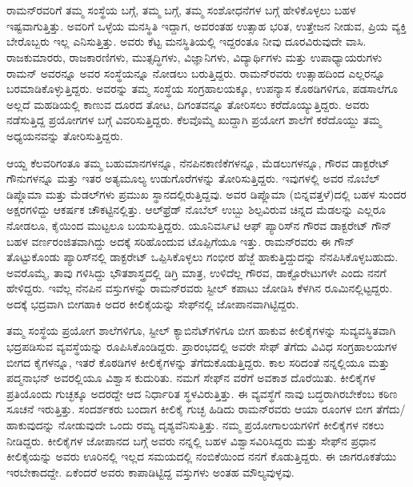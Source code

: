 
\chapter{}


ರಾಮನ್‍ರವರಿಗೆ ತಮ್ಮ ಸಂಸ್ಥೆಯ ಬಗ್ಗೆ, ತಮ್ಮ ಬಗ್ಗೆ, ತಮ್ಮ ಸಂಶೋಧನೆಗಳ ಬಗ್ಗೆ ಹೇಳಿಕೊಳ್ಳಲು ಬಹಳ ಇಷ್ಟವಾಗುತ್ತಿತ್ತು. ಅವರಿಗೆ ಒಳ್ಳೆಯ ಮನಸ್ಥಿತಿ ಇದ್ದಾಗ, ಅವರಂತಹ ಉತ್ಸಾಹ ಭರಿತ, ಉತ್ತೇಜನ ನೀಡುವ, ಪ್ರಿಯ ವ್ಯಕ್ತಿ ಬೇರೊಬ್ಬರು ಇಲ್ಲ ಎನಿಸುತ್ತಿತ್ತು. ಅವರು ಕೆಟ್ಟ ಮನಸ್ಥಿತಿಯಲ್ಲಿ ಇದ್ದರಂತೂ ನೀವು ದೂರವಿರುವುದೇ ವಾಸಿ. ರಾಜಕುಮಾರರು, ರಾಜಕಾರಣಿಗಳು, ಮುತ್ಸದ್ಧಿಗಳು, ವಿಜ್ಞಾನಿಗಳು, ವಿದ್ಯಾರ್ಥಿಗಳು ಮತ್ತು ಉಪಾಧ್ಯಾಯರುಗಳು ರಾಮನ್ ಅವರನ್ನೂ ಅವರ ಸಂಸ್ಥೆಯನ್ನೂ ನೋಡಲು ಬರುತ್ತಿದ್ದರು. ರಾಮನ್‍ರವರು ಉತ್ಸಾಹದಿಂದ ಎಲ್ಲರನ್ನೂ ಬರಮಾಡಿಕೊಳ್ಳುತ್ತಿದ್ದರು. ಅವರನ್ನು ತಮ್ಮ ಸಂಸ್ಥೆಯ ಸಂಗ್ರಹಾಲಯಕ್ಕೂ, ಉಪನ್ಯಾಸ ಕೊಠಡಿಗಳಿಗೂ, ಪಡಸಾಲೆಗೂ ಅಲ್ಲದೆ ಮಹಡಿಯಲ್ಲಿ ಕಾಣುವ ದೂರದ ತೋಟ, ದಿಗಂತವನ್ನೂ ತೋರಿಸಲು ಕರೆದೊಯ್ಯುತ್ತಿದ್ದರು. ಅವರು ನಡೆಸುತ್ತಿದ್ದ ಪ್ರಯೋಗಗಳ ಬಗ್ಗೆ ವಿವರಿಸುತ್ತಿದ್ದರು. ಕೆಲವೊಮ್ಮೆ ಖುದ್ದಾಗಿ ಪ್ರಯೋಗ ಶಾಲೆಗೆ ಕರೆದೊಯ್ದು ತಮ್ಮ ಅಧ್ಯಯನವನ್ನು ತೋರಿಸುತ್ತಿದ್ದರು.

ಆಯ್ದ ಕೆಲವರಿಗಂತೂ ತಮ್ಮ ಬಹುಮಾನಗಳನ್ನೂ, ನೆನಪಿನಕಾಣಿಕೆಗಳನ್ನೂ, ಮೆಡಲುಗಳನ್ನೂ, ಗೌರವ ಡಾಕ್ಟರೇಟ್ ಗೌನುಗಳನ್ನೂ ಮತ್ತು ಇತರ ಅತ್ಯಮೂಲ್ಯ ಉಡುಗೊರೆಗಳನ್ನು ತೋರಿಸುತ್ತಿದ್ದರು. ಇವುಗಳಲ್ಲಿ ಅವರ ನೊಬೆಲ್ ಡಿಪ್ಲೊಮಾ ಮತ್ತು ಮೆಡಲ್‍ಗಳು ಪ್ರಮುಖ ಸ್ಥಾನದಲ್ಲಿರುತ್ತಿದ್ದವು. ಅವರ ಡಿಪ್ಲೊಮಾ (ಬಿನ್ನವತ್ತಳೆ)ದಲ್ಲಿ ಬಹಳ ಸುಂದರ ಅಕ್ಷರಗಳಿದ್ದು ಆಕರ್ಷಕ ಚೌಕಟ್ಟಿನಲ್ಲಿತ್ತು. ಆಲ್‍ಫ್ರೆಡ್ ನೊಬೆಲ್ ಉಬ್ಬು ಶಿಲ್ಪವಿರುವ ಚಿನ್ನದ ಮೆಡಲನ್ನು ಎಲ್ಲರೂ ನೋಡಲೂ, ಕೈಯಿಂದ ಮುಟ್ಟಲೂ ಬಯಸುತ್ತಿದ್ದರು. ಯೂನಿವರ್ಸಿಟಿ ಆಫ್ ಪ್ಯಾರಿಸ್‍ನ ಗೌರವ ಡಾಕ್ಟರೇಟ್ ಗೌನ್ ಬಹಳ ವರ್ಣರಂಜಿತವಾಗಿದ್ದು ಅದಕ್ಕೆ ಸರಿಹೊಂದುವ ಟೊಪ್ಪಿಗೆಯೂ ಇತ್ತು. ರಾಮನ್‍ರವರು ಈ ಗೌನ್ ತೊಟ್ಟುಕೊಂಡು ಪ್ಯಾರಿಸ್‍ನಲ್ಲಿ ಡಾಕ್ಟರೇಟ್ ಒಪ್ಪಿಸಿಕೊಳ್ಳಲು ಗಂಭೀರ ಹೆಜ್ಜೆ ಹಾಕುತ್ತಿದ್ದುದನ್ನು ನೆನಪಿಸಿಕೊಳ್ಳಬಹುದು. ಅವರೊಮ್ಮೆ, ತಾವು ಗಳಿಸಿದ್ದು ಭೌತಶಾಸ್ತ್ರದಲ್ಲಿ ಡಿಗ್ರಿ ಮಾತ್ರ, ಉಳಿದೆಲ್ಲ ಗೌರವ, ಡಾಕ್ಟೊರೇಟುಗಳೇ ಎಂದು ನನಗೆ ಹೇಳಿದ್ದರು. ಇವೆಲ್ಲ ನೆನಪಿನ ವಸ್ತುಗಳನ್ನು ರಾಮನ್‍ರವರು ಸ್ಟೀಲ್ ಕಪಾಟು ಜೋಡಿಸಿ ಕೆಳಗಿನ ರೂಮಿನಲ್ಲಿಟ್ಟದ್ದರು. ಅದಕ್ಕೆ ಭದ್ರವಾಗಿ ಬೀಗಹಾಕಿ ಅದರ ಕೀಲಿಕೈಯನ್ನು ಸೇಫ್‍ನಲ್ಲಿ ಜೋಪಾನವಾಗಿಟ್ಟಿದ್ದರು.

ತಮ್ಮ ಸಂಸ್ಥೆಯ ಪ್ರಯೋಗ ಶಾಲೆಗಳಿಗೂ, ಸ್ಟೀಲ್ ಕ್ಯಾಬಿನೆಟ್‍ಗಳಿಗೂ ಬೀಗ ಹಾಕುವ ಕೀಲಿಕೈಗಳನ್ನು ಸುವ್ಯವಸ್ಥಿತವಾಗಿ ಭದ್ರಪಡಿಸುವ ವ್ಯವಸ್ಥೆಯನ್ನು ರೂಪಿಸಿಕೊಂಡಿದ್ದರು. ಪ್ರಾರಂಭದಲ್ಲಿ ಅವರೇ ಸೇಫ್ ತೆಗೆದು ವಿವಿಧ ಸಂಗ್ರಹಾಲಯಗಳ ಬೀಗದ ಕೈಗಳನ್ನೂ, ಇತರೆ ಕೊಠಡಿಗಳ ಕೀಲಿಕೈಗಳನ್ನು ತೆಗೆದುಕೊಡುತ್ತಿದ್ದರು. ಕಾಲ ಸರಿದಂತೆ ನನ್ನಲ್ಲಿಯೂ ಮತ್ತು ಪದ್ಮನಾಭನ್ ಅವರಲ್ಲಿಯೂ ವಿಶ್ವಾಸ ಕುದುರಿತು. ನಮಗೆ ಸೇಫ್‍ನ ವರೆಗೆ ಅವಕಾಶ ದೊರೆಯಿತು. ಕೀಲಿಕೈಗಳ ಪ್ರತಿಯೊಂದು ಗುಚ್ಛಕ್ಕೂ ಅದರದ್ದೇ ಆದ ನಿರ್ಧಾರಿತ ಸ್ಥಳವಿರುತ್ತಿತ್ತು. ಈ ವ್ಯವಸ್ಥೆಗೆ ನಾವು ಬದ್ಧರಾಗಿರಬೇಕೆಂಬ ಕಠಿಣ ಸೂಚನೆ ಇರುತ್ತಿತ್ತು. ಸಂದರ್ಶಕರು ಬಂದಾಗ ಕೀಲಿಕೈ ಗುಚ್ಛ ಹಿಡಿದು ರಾಮನ್‍ರವರು ಆಯಾ ರೂಂಗಳ ಬೀಗ ತೆಗೆದು/ಹಾಕುವುದನ್ನು ನೋಡುವುದೇ ಒಂದು ರಮ್ಯ ದೃಶ್ಯವೆನಿಸುತ್ತಿತ್ತು. ನಮ್ಮ ಪ್ರಯೋಗಾಲಯಗಳಿಗೆ ಕೀಲಿಕೈಗಳ ನಕಲು ನೀಡಿದ್ದರು. ಕೀಲಿಕೈಗಳ ಜೋಪಾನದ ಬಗ್ಗೆ ಅವರು ನನ್ನಲ್ಲಿ ಬಹಳ ವಿಶ್ವಾಸವಿರಿಸಿದ್ದರು ಮತ್ತು ಸೇಫ್‍ನ ಪ್ರಧಾನ ಕೀಲಿಕೈಯನ್ನು ಅವರು ಊರಿನಲ್ಲಿ ಇಲ್ಲದ ಸಮಯದಲ್ಲಿ ನಂಬಿಕೆಯಿಂದ ನನಗೆ ಕೊಡುತ್ತಿದ್ದರು. ಈ ಜಾಗರೂಕತೆಯು ಇರಬೇಕಾದದ್ದೇ. ಏಕೆಂದರೆ ಅವರು ಕಾಪಾಡಿಟ್ಟಿದ್ದ ವಸ್ತುಗಳು ಅಂತಹ ಮೌಲ್ಯವುಳ್ಳವು.

